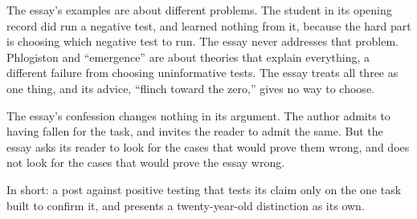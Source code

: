 \begin{afterword}
The essay's examples are about different problems. The student in its opening record did run a negative test, and learned nothing from it, because the hard part is choosing which negative test to run. The essay never addresses that problem. Phlogiston and ``emergence'' are about theories that explain everything, a different failure from choosing uninformative tests. The essay treats all three as one thing, and its advice, ``flinch toward the zero,'' gives no way to choose.

The essay's confession changes nothing in its argument. The author admits to having fallen for the task, and invites the reader to admit the same. But the essay asks its reader to look for the cases that would prove them wrong, and does not look for the cases that would prove the essay wrong.

In short: a post against positive testing that tests its claim only on the one task built to confirm it, and presents a twenty-year-old distinction as its own.
\end{afterword}
